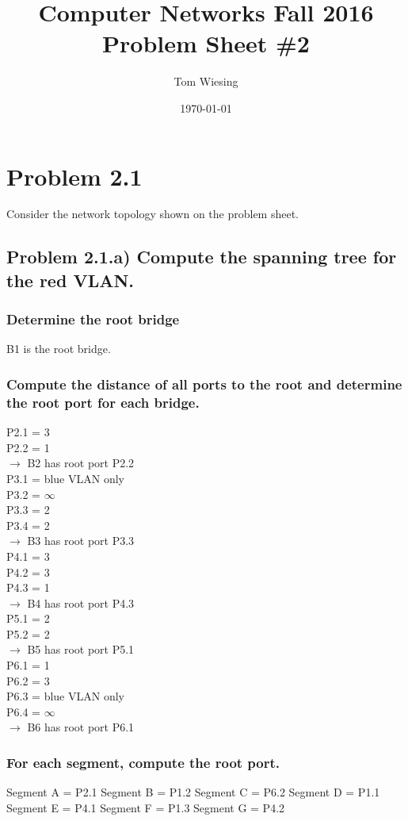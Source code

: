 \documentclass[a4paper,10pt]{article}
\title{Computer Networks Fall 2016\\Problem Sheet \#2}
\author{Tom Wiesing}
\date{\today}
\begin{document}
\maketitle
\section{Problem 2.1}
Consider the network topology shown on the problem sheet.
\subsection{Problem 2.1.a) Compute the spanning tree for the red VLAN.}
\subsubsection{Determine the root bridge}
B1 is the root bridge.
\subsubsection{Compute the distance of all ports to the root and determine the root port for each bridge. }
P2.1 = 3\\
P2.2 = 1\\
$\rightarrow$ B2 has root port P2.2\\
P3.1 = blue VLAN only\\
P3.2 = $\infty$\\
P3.3 = 2\\
P3.4 = 2\\
$\rightarrow$ B3 has root port P3.3\\
P4.1 = 3\\
P4.2 = 3\\
P4.3 = 1\\
$\rightarrow$ B4 has root port P4.3\\
P5.1 = 2\\
P5.2 = 2\\
$\rightarrow$ B5 has root port P5.1\\
P6.1 = 1\\
P6.2 = 3\\
P6.3 = blue VLAN only\\
P6.4 = $\infty$\\
$\rightarrow$ B6 has root port P6.1
\subsubsection{For each segment, compute the root port. }
Segment A = P2.1
Segment B = P1.2
Segment C = P6.2
Segment D = P1.1
Segment E = P4.1
Segment F = P1.3
Segment G = P4.2
\end{document}
